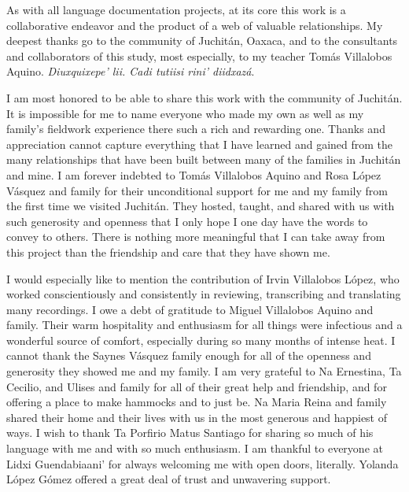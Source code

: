 \begin{refsection}

As with all language documentation projects, at its core this work is a collaborative endeavor and the product of a web of valuable relationships. My deepest thanks go to the community of Juchit\'{a}n, Oaxaca, and to the consultants and collaborators of this study, most especially, to my teacher Tom\'{a}s Villalobos Aquino. \textit{Diuxquixepe’ lii. Cadi tutiisi rini’ diidxaz\'{a}}. 

I am most honored to be able to share this work with the community of Juchit\'{a}n. It is impossible for me to name everyone who made my own as well as my family’s fieldwork experience there such a rich and rewarding one. Thanks and appreciation cannot capture everything that I have learned and gained from the many relationships that have been built between many of the families in Juchit\'{a}n and mine. I am forever indebted to Tom\'{a}s Villalobos Aquino and Rosa L\'{o}pez V\'{a}squez and family for their unconditional support for me and my family from the first time we visited Juchit\'{a}n. They hosted, taught, and shared with us with such generosity and openness that I only hope I one day have the words to convey to others. There is nothing more meaningful that I can take away from this project than the friendship and care that they have shown me.

I would especially like to mention the contribution of Irvin Villalobos L\'{o}pez, who worked conscientiously and consistently in reviewing, transcribing and translating many recordings. I owe a debt of gratitude to Miguel Villalobos Aquino and family. Their warm hospitality and enthusiasm for all things were infectious and a wonderful source of comfort, especially during so many months of intense heat. I cannot thank the Saynes V\'{a}squez family enough for all of the openness and generosity they showed me and my family. I am very grateful to Na Ernestina, Ta Cecilio, and Ulises and family for all of their great help and friendship, and for offering a place to make hammocks and to just be. Na Maria Reina and family shared their home and their lives with us in the most generous and happiest of ways. I wish to thank Ta Porfirio Matus Santiago for sharing so much of his language with me and with so much enthusiasm. I am thankful to everyone at Lidxi Guendabiaani’ for always welcoming me with open doors, literally. Yolanda L\'{o}pez G\'{o}mez offered a great deal of trust and unwavering support. 


\end{refsection}
